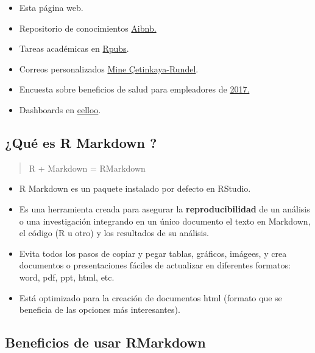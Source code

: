 \documentclass[
]{article}
\providecommand{\tightlist}{%
  \setlength{\itemsep}{0pt}\setlength{\parskip}{0pt}}
\begin{document}
\begin{itemize}
\tightlist
\item
  Esta página web.
\item
  Repositorio de conocimientos
  \href{https://www.tandfonline.com/doi/full/10.1080/00031305.2017.1392362?journalCode=utas20}{Aibnb.}
\item
  Tareas académicas en \href{https://rpubs.com/}{Rpubs}.
\item
  Correos personalizados
  \href{https://rmarkdown.rstudio.com/articles_mail_merge.html}{Mine
  Çetinkaya-Rundel}.
\item
  Encuesta sobre beneficios de salud para empleadores de
  \href{https://www.kff.org/health-costs/report/2017-employer-health-benefits-survey/}{2017.}
\item
  Dashboards en
  \href{https://www.eelloo.nl/wp-content/uploads/2017/08/infographic_Voorbeelden-infographics-Overzicht.pdf}{eelloo}.
\end{itemize}

\hypertarget{quuxe9-es-r-markdown}{%
\subsection{¿Qué es R Markdown ?}\label{quuxe9-es-r-markdown}}

\begin{quote}
R + Markdown = RMarkdown
\end{quote}

\begin{itemize}
\item
  R Markdown es un paquete instalado por defecto en RStudio.
\item
  Es una herramienta creada para asegurar la \textbf{reproducibilidad}
  de un análisis o una investigación integrando en un único documento el
  texto en Markdown, el código (R u otro) y los resultados de su
  análisis.
\item
  Evita todos los pasos de copiar y pegar tablas, gráficos, imágees, y
  crea documentos o presentaciones fáciles de actualizar en diferentes
  formatos: word, pdf, ppt, html, etc.
\item
  Está optimizado para la creación de documentos html (formato que se
  beneficia de las opciones más interesantes).
\end{itemize}

\hypertarget{beneficios-de-usar-rmarkdown}{%
\subsection{Beneficios de usar
RMarkdown}\label{beneficios-de-usar-rmarkdown}}
\end{document}
